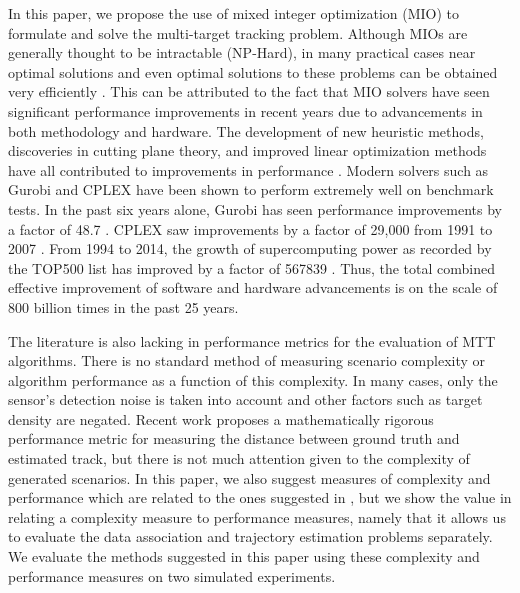 In this paper, we propose the use of mixed integer optimization (MIO) to formulate and solve the multi-target tracking problem. Although MIOs are generally thought to be intractable (NP-Hard), in many practical cases near optimal solutions and even optimal solutions to these problems can be obtained very efficiently \cite{Computation}. This can be attributed to the fact that MIO solvers have seen significant performance improvements in recent years due to advancements in both methodology and hardware. The development of new heuristic methods, discoveries in cutting plane theory, and improved linear optimization methods have all contributed to improvements in performance \cite{Gurobi-MIP}. Modern solvers such as Gurobi and CPLEX have been shown to perform extremely well on benchmark tests. In the past six years alone, Gurobi has seen performance improvements by a factor of 48.7 \cite{Gurobi-Benchmark}. CPLEX saw improvements by a factor of 29,000 from 1991 to 2007 \cite{CPLEX-Benchmark}. From 1994 to 2014, the growth of supercomputing power as recorded by the TOP500 list has improved by a factor of 567839 \cite{Supercomputer}. Thus, the total combined effective improvement of software and hardware advancements is on the scale of 800 billion times in the past 25 years. 

The literature is also lacking in performance metrics for the evaluation of MTT algorithms. There is no standard method of measuring scenario complexity or algorithm performance as a function of this complexity. In many cases, only the sensor's detection noise is taken into account and other factors such as target density are negated. Recent work \cite{MTT-Performance} proposes a mathematically rigorous performance metric for measuring the distance between ground truth and estimated track, but there is not much attention given to the complexity of generated scenarios. In this paper, we also suggest measures of complexity and performance which are related to the ones suggested in \cite{MTT-Performance}, but we show the value in relating a complexity measure to performance measures, namely that it allows us to evaluate the data association and trajectory estimation problems separately. We evaluate the methods suggested in this paper using these complexity and performance measures on two simulated experiments.

